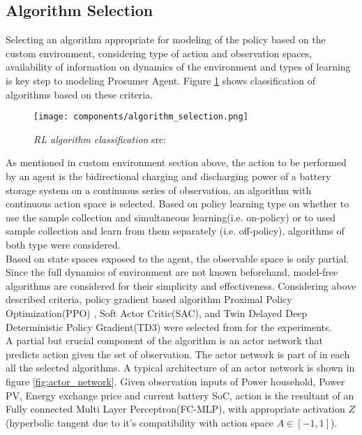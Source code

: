 \begin{large}
\section{Algorithm Selection}

Selecting an algorithm appropriate for modeling of the policy based on the custom environment, considering type of action and observation spaces, availability of information on dynamics of the environment and types of learning is key step to modeling Prosumer Agent. Figure \ref{fig:algorithm_selection} shows classification of algorithms based on these criteria. \\


\begin{figure}[h]
	\begin{center}
		\texttt{[image: components/algorithm\_selection.png]}
		\caption{ \textit{RL algorithm classification} src: \cite{openaispin}}
		\label{fig:algorithm_selection}
	\end{center}
\end{figure}


As mentioned in custom environment section above, the action to be performed by an agent is the bidirectional charging and discharging power of a battery storage system on a continuous series of observation, an algorithm with continuous action space is selected. Based on policy learning type on whether to use the sample collection and simultaneous learning(i.e. on-policy) or to used sample collection and learn from them separately (i.e. off-policy), algorithms of both type were considered. \\


Based on state spaces exposed to the agent, the observable space is only partial. Since the full dynamics of environment are not known beforehand, model-free algorithms are considered for their simplicity and effectiveness. Considering above described criteria, policy gradient based algorithm Proximal Policy Optimization(PPO) \cite{ppo}, Soft Actor Critic(SAC)\cite{sac}, and Twin Delayed Deep Deterministic Policy Gradient(TD3)\cite{td3} were selected from \cite{sb3} for the experiments. \\

A partial but crucial component of the algorithm is an actor network that predicts action given the set of observation. The actor network is part of in each all the selected algorithms. A typical architecture of an actor network is shown in figure \ref{fig:actor_network}. Given observation inputs of Power household, Power PV, Energy exchange price and current battery SoC, action is the resultant of an Fully connected Multi Layer Perceptron(FC-MLP), with appropriate activation $Z$(hyperbolic tangent due to it's compatibility with action space $A \in [-1,1]$). \\


\end{large}
